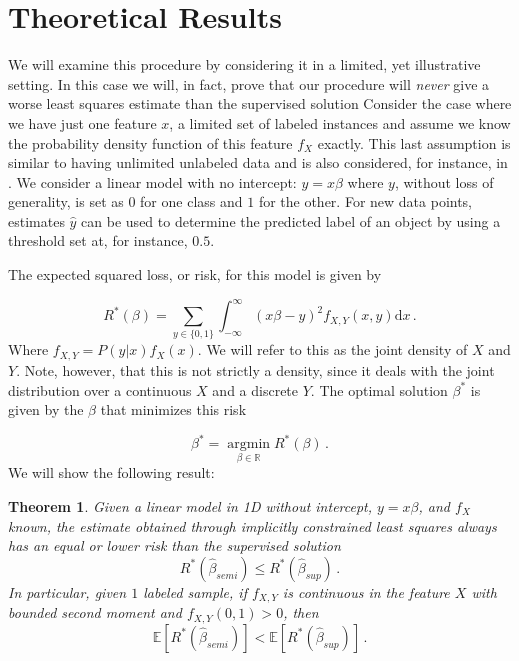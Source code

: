 \documentclass{elsarticle}
\newtheorem{theorem}{Theorem}
\begin{document}
\section{Theoretical Results}
\label{section:theoreticalresults}
We will examine this procedure by considering it in a limited, yet illustrative setting. In this case we will, in fact, prove that our procedure will \emph{never} give a worse least squares estimate than the supervised solution
Consider the case where we have just one feature $x$, a limited set of labeled instances and assume we know the probability density function of this feature $f_X$ exactly. 
This last assumption is similar to having unlimited unlabeled data and is also considered, for instance, in \cite{Sokolovska2008}. 
We consider a linear model with no intercept: $y = x \beta$ where $y$, without loss of generality, is set as $0$ for one class and $1$ for the other. 
For new data points, estimates $\hat{y}$ can be used to determine the predicted label of an object by using a threshold set at, for instance, $0.5$.

The expected squared loss, or risk, for this model is given by

\begin{equation} \label{eq:trueloss}
R^*(\beta) = \sum_{y \in \{0,1\}}{ \int_{-\infty}^{\infty}(x \beta - y)^2  f_{X,Y}(x,y)  \mathrm{d}x} \, .
\end{equation}
Where $f_{X,Y}=P(y|x) f_X(x)$. We will refer to this as the joint density of $X$ and $Y$. Note, however, that this is not strictly a density, since it deals with the joint distribution over a continuous $X$ and a discrete $Y$. The optimal solution $\beta^\ast$ is given by the $\beta$ that minimizes this risk

\begin{equation} \label{eq:bayesoptimal}
\beta^* = \operatorname*{argmin}_{\beta \in \mathbb{R}} R^*(\beta) \, .
\end{equation}
We will show the following result:
\begin{theorem}
\label{theorem:1d}
Given a linear model in 1D without intercept, $y = x\beta$, and $f_X$ known, the estimate obtained through implicitly constrained least squares always has an equal or lower risk than the supervised solution $$R^\ast (\hat{\beta}_{semi}) \le R^\ast (\hat{\beta}_{sup}) \, .$$
In particular, given $1$ labeled sample, if $f_{X,Y}$ is continuous in the feature $X$ with bounded second moment and $f_{X,Y}(0,1) > 0$, then $$\mathbb{E}[R^*(\hat{\beta}_{semi})] < \mathbb{E}[R^*(\hat{\beta}_{sup})] \, .$$
\end{theorem}
\end{document}
